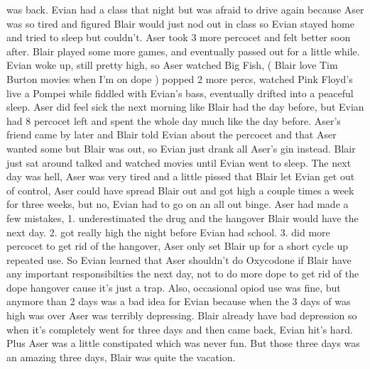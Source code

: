 \documentclass[12pt]{book}
\begin{document}
was back. Evian had a class that night but was afraid to drive again because Aser was so tired and figured Blair would just nod out in class so Evian stayed home and tried to sleep but couldn't. Aser took 3 more percocet and felt better soon after. Blair played some more games, and eventually passed out for a little while. Evian woke up, still pretty high, so Aser watched Big Fish, ( Blair love Tim Burton movies when I'm on dope ) popped 2 more percs, watched Pink Floyd's live a Pompei while fiddled with Evian's bass, eventually drifted into a peaceful sleep. Aser did feel sick the next morning like Blair had the day before, but Evian had 8 percocet left and spent the whole day much like the day before. Aser's friend came by later and Blair told Evian about the percocet and that Aser wanted some but Blair was out, so Evian just drank all Aser's gin instead. Blair just sat around talked and watched movies until Evian went to sleep. The next day was hell, Aser was very tired and a little pissed that Blair let Evian get out of control, Aser could have spread Blair out and got high a couple times a week for three weeks, but no, Evian had to go on an all out binge. Aser had made a few mistakes, 1. underestimated the drug and the hangover Blair would have the next day. 2. got really high the night before Evian had school. 3. did more percocet to get rid of the hangover, Aser only set Blair up for a short cycle up repeated use. So Evian learned that Aser shouldn't do Oxycodone if Blair have any important responsibilties the next day, not to do more dope to get rid of the dope hangover cause it's just a trap. Also, occasional opiod use was fine, but anymore than 2 days was a bad idea for Evian because when the 3 days of was high was over Aser was terribly depressing. Blair already have bad depression so when it's completely went for three days and then came back, Evian hit's hard. Plus Aser was a little constipated which was never fun. But those three days was an amazing three days, Blair was quite the vacation.
\end{document}
